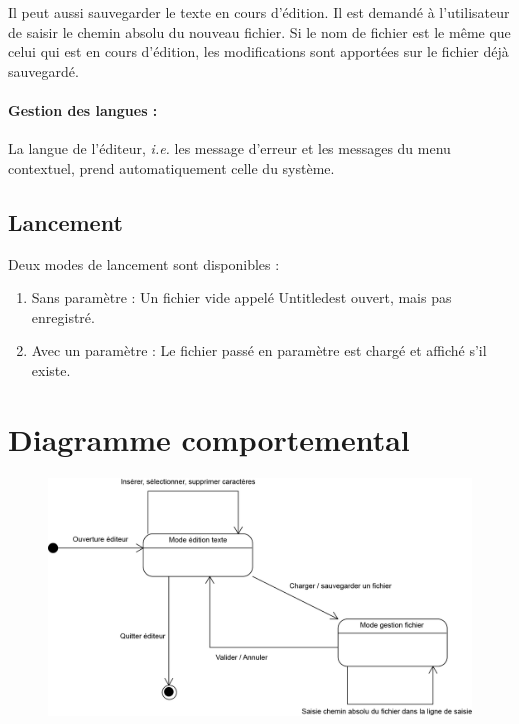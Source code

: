 Il peut aussi sauvegarder le texte en cours d'édition. Il est demandé à
l'utilisateur de saisir le chemin absolu du nouveau fichier. Si le nom de
fichier est le même que celui qui est en cours d'édition, les modifications
sont apportées sur le fichier déjà sauvegardé.

\paragraph{Gestion des langues :}
La langue de l'éditeur, \textsl{i.e.} les message d'erreur et les messages du menu contextuel, prend automatiquement celle du système.

\subsection{Lancement}
Deux modes de lancement sont disponibles :
\begin{enumerate}
	\item Sans paramètre : Un fichier vide appelé \og Untitled\fg est ouvert, mais pas enregistré.
	\item Avec un paramètre : Le fichier passé en paramètre est chargé et affiché s'il existe.
\end{enumerate}

\section{Diagramme comportemental}
\begin{figure}[H]
\begin{center}
    \includegraphics[width=13cm]{img/EtatsEditeur}
	\vspace{-1cm}
\end{center}
\end{figure}

